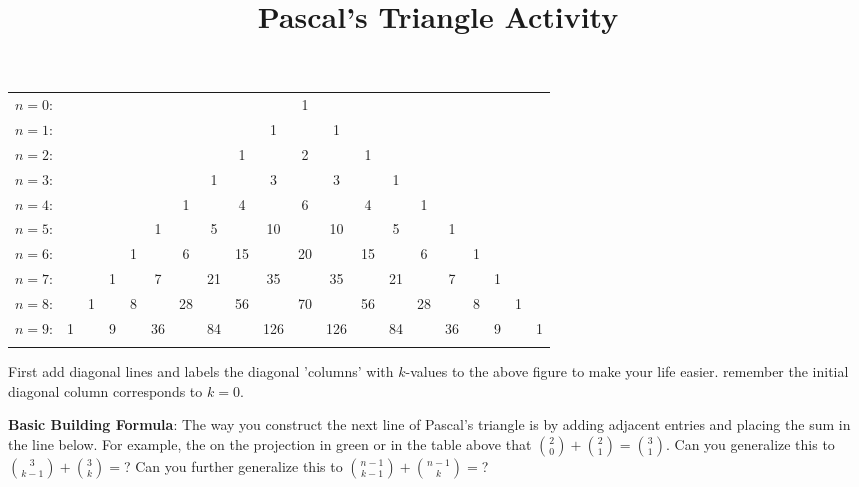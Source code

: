 \documentclass[11pt]{amsart}
\title{Pascal's Triangle Activity}
\begin{document}
\maketitle

\begin{tabular}{rccccccccccccccccccc}
$n=0$:&&&&&&    &    &    &    &  1\\\noalign{\smallskip\smallskip}
$n=1$:&&&&&&   &    &    &  1 &    &  1\\\noalign{\smallskip\smallskip}
$n=2$:&&&&&&    &    &  1 &    &  2 &    &  1\\\noalign{\smallskip\smallskip}
$n=3$:&&&&&&    &  1 &    &  3 &    &  3 &    &  1\\\noalign{\smallskip\smallskip}
$n=4$:&&&&& & 1 &    &  4 &    &  6 &    &  4 &    &  1\\\noalign{\smallskip\smallskip}
$n=5$:&&&&&1&  &5 &    &  10 &    &  10 &    &  5 &    &  1\\\noalign{\smallskip\smallskip}
$n=6$:&&&&1&  &6 &    &  15 &    &  20 &    &  15 &    &  6 &&1\\\noalign{\smallskip\smallskip}
$n=7$:&&&1&  &7 &    &  21 &    &  35 &    &  35 &    &  21&&7&&1\\\noalign{\smallskip\smallskip}
$n=8$:&&1&  &8&    &  28 &    &  56 &    & 70 &    &  56&&28&&8&&1\\\noalign{\smallskip\smallskip}
$n=9$:&1&  &9&    &  36 &    &  84 &    & 126 &    &  126&&84&&36&&9&&1\\\noalign{\smallskip\smallskip}
\end{tabular}
\vspace{.5cm}

First add diagonal lines and labels the diagonal 'columns' with $k$-values to the above figure to make your life easier.  remember the initial diagonal column corresponds to $k=0$.\vspace{.25cm}

{\bf Basic Building Formula}:  The way you construct the next line of Pascal's triangle is by adding adjacent entries and placing the sum in the line below.\vspace{.5cm} For example, the on the projection in green or in the table above that $\binom{2}{0}+\binom{2}{1}=\binom{3}{1}$.  Can you generalize this to $\binom{3}{k-1}+\binom{3}{k}=$? Can you further generalize this to $\binom{n-1}{k-1}+\binom{n-1}{k}=$?\vspace{.25cm}
\end{document}

